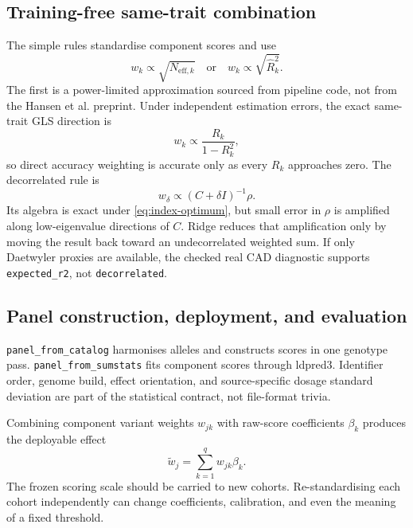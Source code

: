 \documentclass[10pt,a4paper]{article}
\newcommand{\code}[1]{\texttt{#1}}
\begin{document}
\subsection{Training-free same-trait combination}

The simple rules standardise component scores and use
\begin{equation}
  w_k\propto\sqrt{N_{\mathrm{eff},k}}
  \quad\text{or}\quad
  w_k\propto\sqrt{\widehat R_k^2}.
  \label{eq:meta-simple}
\end{equation}
The first is a power-limited approximation sourced from pipeline code, not
from the Hansen et al. preprint. Under independent estimation errors, the
exact same-trait GLS direction is
\begin{equation}
  w_k\propto\frac{R_k}{1-R_k^2},
  \label{eq:meta-gls}
\end{equation}
so direct accuracy weighting is accurate only as every \(R_k\) approaches
zero. The decorrelated rule is
\begin{equation}
  w_\delta\propto(C+\delta I)^{-1}\rho.
  \label{eq:meta-decorrelated}
\end{equation}
Its algebra is exact under \cref{eq:index-optimum}, but small error in
\(\rho\) is amplified along low-eigenvalue directions of \(C\). Ridge reduces
that amplification only by moving the result back toward an undecorrelated
weighted sum. If only Daetwyler proxies are available, the checked real CAD
diagnostic supports \code{expected\_r2}, not \code{decorrelated}.

\subsection{Panel construction, deployment, and evaluation}

\code{panel\_from\_catalog} harmonises alleles and constructs scores in one
genotype pass. \code{panel\_from\_sumstats} fits component scores through
ldpred3. Identifier order, genome build, effect orientation, and
source-specific dosage standard deviation are part of the statistical
contract, not file-format trivia.

Combining component variant weights \(w_{jk}\) with raw-score coefficients
\(\beta_k\) produces the deployable effect
\begin{equation}
  \widetilde w_j=\sum_{k=1}^{q}w_{jk}\beta_k .
  \label{eq:combined-weights}
\end{equation}
The frozen scoring scale should be carried to new cohorts. Re-standardising
each cohort independently can change coefficients, calibration, and even the
meaning of a fixed threshold.
\end{document}
